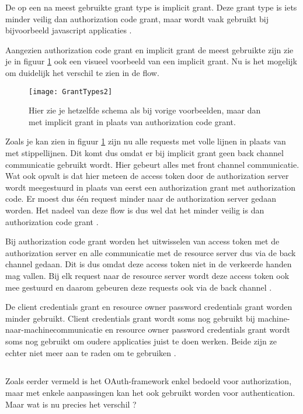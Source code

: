 De op een na meest gebruikte grant type is implicit grant. Deze grant type is iets minder veilig dan authorization code grant, maar wordt vaak gebruikt bij bijvoorbeeld javascript applicaties \autocite{OktaDev2018}. 

Aangezien authorization code grant en implicit grant de meest gebruikte zijn zie je in figuur \ref{fig:grantTypes2} ook een visueel voorbeeld van een implicit grant. Nu is het mogelijk om duidelijk het verschil te zien in de flow.
\begin{figure}[H]
	\centering
	\texttt{[image: GrantTypes2]} 
	\caption[Visuele voorstelling van implicit grant]{Hier zie je hetzelfde schema als bij vorige voorbeelden, maar dan met implicit grant in plaats van authorization code grant.}
	\label{fig:grantTypes2}
\end{figure}
Zoals je kan zien in figuur \ref{fig:grantTypes2} zijn nu alle requests met volle lijnen in plaats van met stippellijnen. Dit komt dus omdat er bij implicit grant geen back channel communicatie gebruikt wordt. Hier gebeurt alles met front channel communicatie. Wat ook opvalt is dat hier meteen de access token door de authorization server wordt meegestuurd in plaats van eerst een authorization grant met authorization code. Er moest dus één request minder naar de authorization server gedaan worden. Het nadeel van deze flow is dus wel dat het minder veilig is dan authorization code grant \autocite{OktaDev2018}. 

Bij authorization code grant worden het uitwisselen van access token met de authorization server en alle communicatie met de resource server dus via de back channel gedaan. Dit is dus omdat deze access token niet in de verkeerde handen mag vallen. Bij elk request naar de resource server wordt deze access token ook mee gestuurd en daarom gebeuren deze requests ook via de back channel \autocite{OktaDev2018}.

De client credentials grant en resource owner password credentials grant worden minder gebruikt. Client credentials grant wordt soms nog gebruikt bij machine-naar-machinecommunicatie en resource owner password credentials grant wordt soms nog gebruikt om oudere applicaties juist te doen werken. Beide zijn ze echter niet meer aan te raden om te gebruiken \autocite{OktaDev2018}.

\subsection{}
Zoals eerder vermeld is het OAuth-framework enkel bedoeld voor authorization, maar met enkele aanpassingen kan het ook gebruikt worden voor authentication. Maar wat is nu precies het verschil \autocite{rwike772020}?

